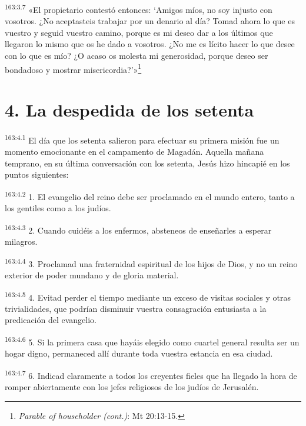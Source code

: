 \par 
\textsuperscript{163:3.7} «El propietario contestó entonces: `Amigos míos, no soy injusto con vosotros. ¿No aceptasteis trabajar por un denario al día? Tomad ahora lo que es vuestro y seguid vuestro camino, porque es mi deseo dar a los últimos que llegaron lo mismo que os he dado a vosotros. ¿No me es lícito hacer lo que desee con lo que es mío? ¿O acaso os molesta mi generosidad, porque deseo ser bondadoso y mostrar misericordia?'»\footnote{\textit{Parable of householder (cont.)}: Mt 20:13-15.}

\section*{4. La despedida de los setenta}
\par 
\textsuperscript{163:4.1} El día que los setenta salieron para efectuar su primera misión fue un momento emocionante en el campamento de Magadán. Aquella mañana temprano, en su última conversación con los setenta, Jesús hizo hincapié en los puntos siguientes:

\par 
\textsuperscript{163:4.2} 1. El evangelio del reino debe ser proclamado en el mundo entero, tanto a los gentiles como a los judíos.

\par 
\textsuperscript{163:4.3} 2. Cuando cuidéis a los enfermos, absteneos de enseñarles a esperar milagros.

\par 
\textsuperscript{163:4.4} 3. Proclamad una fraternidad espiritual de los hijos de Dios, y no un reino exterior de poder mundano y de gloria material.

\par 
\textsuperscript{163:4.5} 4. Evitad perder el tiempo mediante un exceso de visitas sociales y otras trivialidades, que podrían disminuir vuestra consagración entusiasta a la predicación del evangelio.

\par 
\textsuperscript{163:4.6} 5. Si la primera casa que hayáis elegido como cuartel general resulta ser un hogar digno, permaneced allí durante toda vuestra estancia en esa ciudad.

\par 
\textsuperscript{163:4.7} 6. Indicad claramente a todos los creyentes fieles que ha llegado la hora de romper abiertamente con los jefes religiosos de los judíos de Jerusalén.

